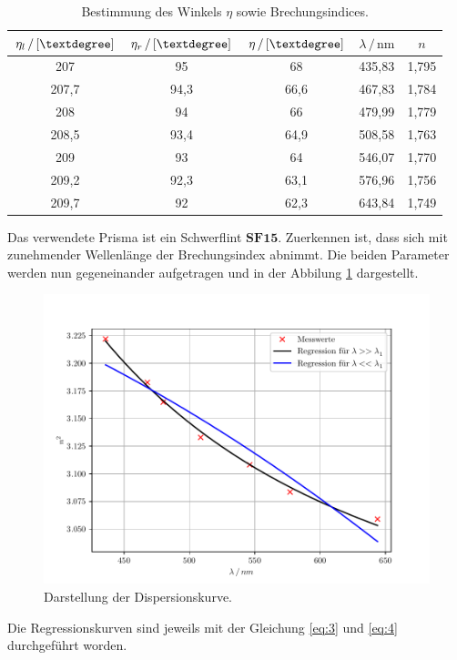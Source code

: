 \begin{table}[H]
  \centering
  \caption{Bestimmung des Winkels $\eta$ sowie Brechungsindices.}
  \label{tab:2}
  \begin{tabular}{c c c c c}
    \toprule
    $\eta_l\,/\,[\textdegree]$ & $\eta_r\,/\,[\textdegree]$ & $\eta \,/\,[\textdegree]$ &$\lambda \,/\,\si{\nano\meter}$ & $n$\\
    \midrule
    207 & 95 & 68 & 435,83 & 1,795\\
    207,7 & 94,3 & 66,6 & 467,83 & 1,784\\
    208 & 94 & 66 & 479,99 & 1,779\\
    208,5 & 93,4 & 64,9 & 508,58 & 1,763\\
    209 & 93 & 64 & 546,07 & 1,770\\
    209,2 & 92,3 & 63,1 & 576,96 & 1,756\\
    209,7 & 92 & 62,3 & 643,84 & 1,749\\
    \bottomrule
  \end{tabular}
\end{table}
Das verwendete Prisma ist ein Schwerflint $\textbf{SF15}$. Zuerkennen ist, dass
sich mit zunehmender Wellenlänge der Brechungsindex abnimmt.
Die beiden Parameter werden nun gegeneinander aufgetragen und in der Abbilung \ref{abb:4} dargestellt.
\begin{figure}[H]
  \centering
  \includegraphics[width=\textwidth]{plot1.pdf}
  \caption{Darstellung der Dispersionskurve.}
  \label{abb:4}
\end{figure}
Die Regressionskurven sind jeweils mit der Gleichung \ref{eq:3} und \ref{eq:4} durchgeführt worden.

